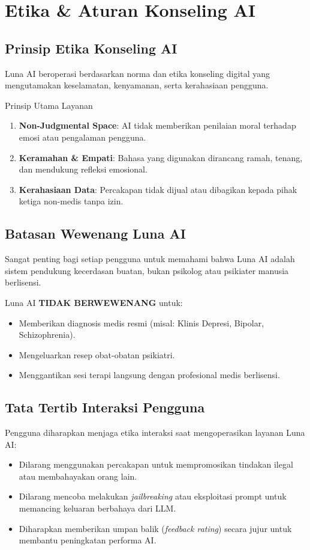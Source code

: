 \chapter{Etika \& Aturan Konseling AI}

\section{Prinsip Etika Konseling AI}
Luna AI beroperasi berdasarkan norma dan etika konseling digital yang mengutamakan keselamatan, kenyamanan, serta kerahasiaan pengguna.

\begin{lunacallout}{Prinsip Utama Layanan}
\begin{enumerate}
    \item \textbf{Non-Judgmental Space}: AI tidak memberikan penilaian moral terhadap emosi atau pengalaman pengguna.
    \item \textbf{Keramahan \& Empati}: Bahasa yang digunakan dirancang ramah, tenang, dan mendukung refleksi emosional.
    \item \textbf{Kerahasiaan Data}: Percakapan tidak dijual atau dibagikan kepada pihak ketiga non-medis tanpa izin.
\end{enumerate}
\end{lunacallout}

\section{Batasan Wewenang Luna AI}
Sangat penting bagi setiap pengguna untuk memahami bahwa Luna AI adalah sistem pendukung kecerdasan buatan, bukan psikolog atau psikiater manusia berlisensi.

\begin{lunawarning}
Luna AI \textbf{TIDAK BERWEWENANG} untuk:
\begin{itemize}
    \item Memberikan diagnosis medis resmi (misal: Klinis Depresi, Bipolar, Schizophrenia).
    \item Mengeluarkan resep obat-obatan psikiatri.
    \item Menggantikan sesi terapi langsung dengan profesional medis berlisensi.
\end{itemize}
\end{lunawarning}

\section{Tata Tertib Interaksi Pengguna}
Pengguna diharapkan menjaga etika interaksi saat mengoperasikan layanan Luna AI:
\begin{itemize}
    \item Dilarang menggunakan percakapan untuk mempromosikan tindakan ilegal atau membahayakan orang lain.
    \item Dilarang mencoba melakukan \textit{jailbreaking} atau eksploitasi prompt untuk memancing keluaran berbahaya dari LLM.
    \item Diharapkan memberikan umpan balik (\textit{feedback rating}) secara jujur untuk membantu peningkatan performa AI.
\end{itemize}

